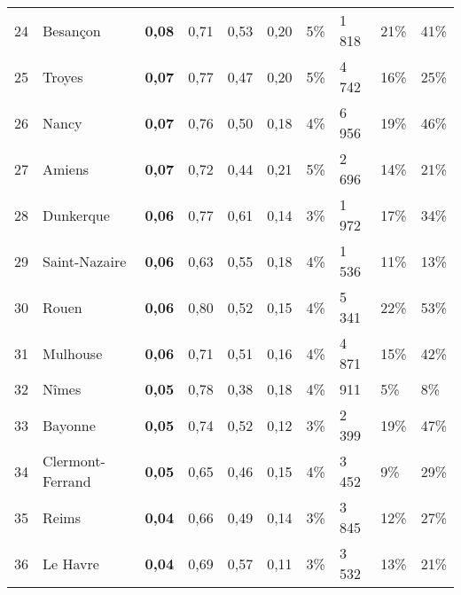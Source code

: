 \begin{longtable}{p{0.5cm}p{4cm}p{0.5cm}p{0.5cm}p{0.5cm}p{0.5cm}p{1cm}p{1cm}p{1cm}p{1cm}}
    \small{24} & \small{Besançon} & \small{\textbf{0,08}} & \small{0,71} & \small{0,53} & \small{0,20} & \small{5\%} & \small{1 818} & \small{21\%} & \small{41\%}\\
    \small{25} & \small{Troyes} & \small{\textbf{0,07}} & \small{0,77} & \small{0,47} & \small{0,20} & \small{5\%} & \small{4 742} & \small{16\%} & \small{25\%}\\
    \small{26} & \small{Nancy} & \small{\textbf{0,07}} & \small{0,76} & \small{0,50} & \small{0,18} & \small{4\%} & \small{6 956} & \small{19\%} & \small{46\%}\\
    \small{27} & \small{Amiens} & \small{\textbf{0,07}} & \small{0,72} & \small{0,44} & \small{0,21} & \small{5\%} & \small{2 696} & \small{14\%} & \small{21\%}\\
    \small{28} & \small{Dunkerque} & \small{\textbf{0,06}} & \small{0,77} & \small{0,61} & \small{0,14} & \small{3\%} & \small{1 972} & \small{17\%} & \small{34\%}\\
    \small{29} & \small{Saint-Nazaire} & \small{\textbf{0,06}} & \small{0,63} & \small{0,55} & \small{0,18} & \small{4\%} & \small{1 536} & \small{11\%} & \small{13\%}\\
    \small{30} & \small{Rouen} & \small{\textbf{0,06}} & \small{0,80} & \small{0,52} & \small{0,15} & \small{4\%} & \small{5 341} & \small{22\%} & \small{53\%}\\
    \small{31} & \small{Mulhouse} & \small{\textbf{0,06}} & \small{0,71} & \small{0,51} & \small{0,16} & \small{4\%} & \small{4 871} & \small{15\%} & \small{42\%}\\
    \small{32} & \small{Nîmes} & \small{\textbf{0,05}} & \small{0,78} & \small{0,38} & \small{0,18} & \small{4\%} & \small{911} & \small{5\%} & \small{8\%}\\
    \small{33} & \small{Bayonne} & \small{\textbf{0,05}} & \small{0,74} & \small{0,52} & \small{0,12} & \small{3\%} & \small{2 399} & \small{19\%} & \small{47\%}\\
    \small{34} & \small{Clermont-Ferrand} & \small{\textbf{0,05}} & \small{0,65} & \small{0,46} & \small{0,15} & \small{4\%} & \small{3 452} & \small{9\%} & \small{29\%}\\
    \small{35} & \small{Reims} & \small{\textbf{0,04}} & \small{0,66} & \small{0,49} & \small{0,14} & \small{3\%} & \small{3 845} & \small{12\%} & \small{27\%}\\
    \small{36} & \small{Le Havre} & \small{\textbf{0,04}} & \small{0,69} & \small{0,57} & \small{0,11} & \small{3\%} & \small{3 532} & \small{13\%} & \small{21\%}\\

\end{longtable}
